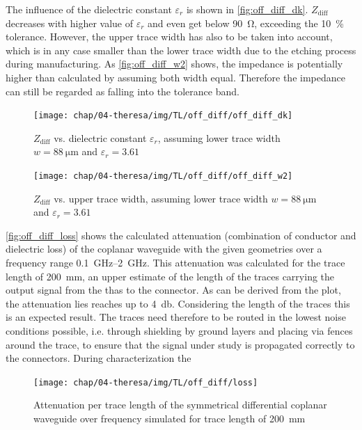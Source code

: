 The influence of the dielectric constant $\varepsilon_r$ is shown in \autoref{fig:off_diff_dk}. 
$Z_\text{diff}$ decreases with higher value of $\varepsilon_r$ and even get below \SI{90}{\ohm}, exceeding the \SI{10}{\percent} tolerance.
However, the upper trace width has also to be taken into account, which is in any case smaller than the lower trace width due to the etching process during manufacturing.
As \autoref{fig:off_diff_w2} shows, the impedance is potentially higher than calculated by assuming both width equal. Therefore the impedance can still be regarded as falling into the tolerance band.
\begin{figure}[tb]
	\centering
	\texttt{[image: chap/04-theresa/img/TL/off\_diff/off\_diff\_dk]}
	\caption[DOWG, $Z_\text{diff}$ vs. $\varepsilon_r$]{$Z_\text{diff}$ vs. dielectric constant $\varepsilon_r$, assuming lower trace width $w = \SI{88}{\micro \meter}$ and $\varepsilon_r = 3.61$}
	\label{fig:off_diff_dk}
\end{figure}


\begin{figure}[tb]
	\centering
	\texttt{[image: chap/04-theresa/img/TL/off\_diff/off\_diff\_w2]}
	\caption[DOWG, $Z_\text{diff}$ vs. upper trace width]{$Z_\text{diff}$ vs. upper trace width, assuming lower trace width $w = \SI{88}{\micro \meter}$ and $\varepsilon_r = 3.61$}
	\label{fig:off_diff_w2}
\end{figure}

\autoref{fig:off_diff_loss} shows the calculated attenuation (combination of conductor and dielectric loss) of the coplanar waveguide with the given geometries over a frequency range \SIrange{0.1}{2}{\GHz}. 
This attenuation was calculated for the trace length of \SI{200}{\mm}, an upper estimate of the length of the traces carrying the output signal from the \glspl{tha} to the connector.
As can be derived from the plot, the attenuation lies reaches up to \SI{4}{\decibel}.
Considering the length of the traces this is an expected result. 
The traces need therefore to be routed in the lowest noise conditions possible, i.e. through shielding by ground layers and placing via fences around the trace, to ensure that the signal under study is propagated correctly to the connectors.
During characterization the 
\begin{figure}[tb]
	\centering
	\texttt{[image: chap/04-theresa/img/TL/off\_diff/loss]}
	\caption[DOWG]{Attenuation per trace length of the symmetrical differential coplanar waveguide over frequency simulated for trace length of \SI{200}{\mm}}
	\label{fig:off_diff_loss}
\end{figure}


